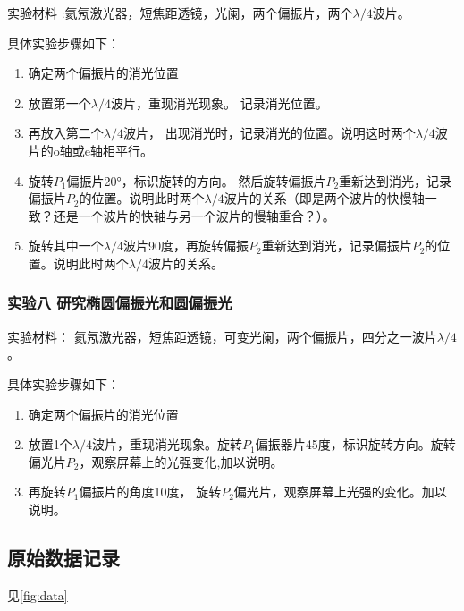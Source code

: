 \documentclass[dvipsnames, svgnames,a4paper,11pt]{article}
\begin{document}
	实验材料 :氦氖激光器，短焦距透镜，光阑，两个偏振片，两个$\lambda/4$波片。

	具体实验步骤如下：
	\begin{enumerate}
		\item 确定两个偏振片的消光位置
		\item 放置第一个$\lambda/4$波片，重现消光现象。 记录消光位置。
		\item 再放入第二个$\lambda/4$波片， 出现消光时，记录消光的位置。说明这时两个$\lambda/4$波片的o轴或e轴相平行。
		\item 旋转$P_1$偏振片20°，标识旋转的方向。 然后旋转偏振片$P_2$重新达到消光，记录偏振片$P_2$的位置。说明此时两个$\lambda/4$波片的关系（即是两个波片的快慢轴一致？还是一个波片的快轴与另一个波片的慢轴重合？）。
		\item 旋转其中一个$\lambda/4$波片90度，再旋转偏振$P_2$重新达到消光，记录偏振片$P_2$的位置。说明此时两个$\lambda/4$波片的关系。
	\end{enumerate}



	\subsubsection{实验八 \quad 研究椭圆偏振光和圆偏振光}

	实验材料： 氦氖激光器，短焦距透镜，可变光阑，两个偏振片，四分之一波片$\lambda/4$。

	具体实验步骤如下：
	\begin{enumerate}
		\item 确定两个偏振片的消光位置
		\item 放置1个$\lambda/4$波片，重现消光现象。旋转$P_1$偏振器片45度，标识旋转方向。旋转偏光片$P_2$，观察屏幕上的光强变化,加以说明。
		\item 再旋转$P_1$偏振片的角度10度， 旋转$P_2$偏光片，观察屏幕上光强的变化。加以说明。

	\end{enumerate}
	




\subsection{原始数据记录}

	见\cref{fig:data}
\end{document}
